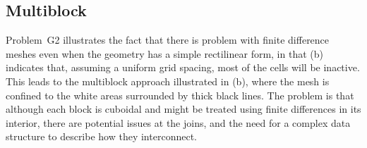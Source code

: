 \subsection{Multiblock}\label{sec:multiblock}
Problem~G2 illustrates the fact that there is problem with finite difference
meshes even when the geometry has a simple rectilinear form, in that (b)
indicates that, assuming a uniform grid spacing, most of the cells will be inactive.
This leads to the multiblock approach illustrated in (b), where the mesh is
confined to the white areas surrounded by thick black lines. The problem is that
although each block is cuboidal and might be treated using finite differences in its
interior, there are potential issues at the joins, and the need for a complex data
structure to describe how they interconnect.

